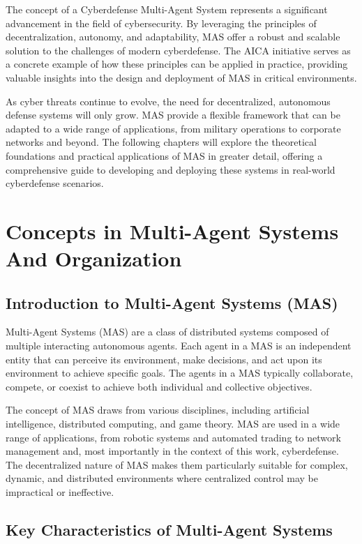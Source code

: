 The concept of a Cyberdefense Multi-Agent System represents a significant advancement in the field of cybersecurity. By leveraging the principles of decentralization, autonomy, and adaptability, MAS offer a robust and scalable solution to the challenges of modern cyberdefense. The AICA initiative serves as a concrete example of how these principles can be applied in practice, providing valuable insights into the design and deployment of MAS in critical environments.

As cyber threats continue to evolve, the need for decentralized, autonomous defense systems will only grow. MAS provide a flexible framework that can be adapted to a wide range of applications, from military operations to corporate networks and beyond. The following chapters will explore the theoretical foundations and practical applications of MAS in greater detail, offering a comprehensive guide to developing and deploying these systems in real-world cyberdefense scenarios.



\section{Concepts in Multi-Agent Systems And Organization}

\subsection{Introduction to Multi-Agent Systems (MAS)}

Multi-Agent Systems (MAS) are a class of distributed systems composed of multiple interacting autonomous agents. Each agent in a MAS is an independent entity that can perceive its environment, make decisions, and act upon its environment to achieve specific goals. The agents in a MAS typically collaborate, compete, or coexist to achieve both individual and collective objectives.

The concept of MAS draws from various disciplines, including artificial intelligence, distributed computing, and game theory. MAS are used in a wide range of applications, from robotic systems and automated trading to network management and, most importantly in the context of this work, cyberdefense. The decentralized nature of MAS makes them particularly suitable for complex, dynamic, and distributed environments where centralized control may be impractical or ineffective.

\subsection{Key Characteristics of Multi-Agent Systems}

